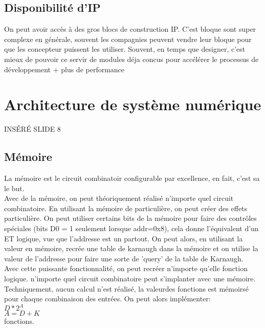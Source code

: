 \documentclass[oneside]{book}
\begin{document}
        \subsection{Disponibilité d'IP}
        On peut avoir accès à des gros blocs de construction IP. C'est bloque sont super complexe en générale, souvent les compagnies peuvent vendre leur bloque pour que les concepteur puissent les utiliser. Souvent, en temps que designer, c'est mieux de pouvoir ce servir de modules déja concus pour accélérer le processus de développement + plus de performance
        \section{Architecture de système numérique}
        INSÉRÉ SLIDE 8\\
        
        \subsection{Mémoire}
        La mémoire est le circuit combinatoir configurable par excellence, en fait, c'est sa le but.\\
        
        Avec de la mémoire, on peut théoriquement réalisé n'importe quel circuit combinatoire. En utilisant la mémoire de particulière, on peut créer des effets particulière. On peut utiliser certains bits de la mémoire pour faire des contrôles spéciales (bits D0 = 1 seulement lorsque addr=0x8), cela donne l'équivalent d'un ET logique, vue que l'addresse est un partout. On peut alors, en utilisant la valeur en mémoire, recrée une table de karnaugh dans la mémoire et on utilise la valeur de l'addresse pour faire une sorte de 'query' de la table de Karnaugh.\\
        
        Avec cette puissante fonctionnalité, on peut recréer n'importe qu'elle fonction logique. n'importe quel circuit combinatoire peut s'implanter avec une mémoire.\\
        
        Techniquement, aucun calcul n'est réalisé, la valeurdes fonctions est mémoirsé pour chaque combinaison des entrées. On peut alors implémenter:\\
        $D * 2^A$\\
        $A = D + K$\\
        
        fonctions.\\
        
\end{document}
